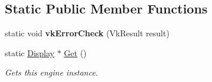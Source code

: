 \subsection*{Static Public Member Functions}
\begin{DoxyCompactItemize}
\item 
\mbox{\label{class_flounder_1_1_display_a98b00dff9d67b05d1a2e55bdb06bc386}} 
static void {\bfseries vk\+Error\+Check} (Vk\+Result result)
\item 
static \hyperlink{class_flounder_1_1_display}{Display} $\ast$ \hyperlink{class_flounder_1_1_display_af96f81e5e34b37397ab39cda9452091e}{Get} ()
\begin{DoxyCompactList}\small\item\em Gets this engine instance. \end{DoxyCompactList}\end{DoxyCompactItemize}
